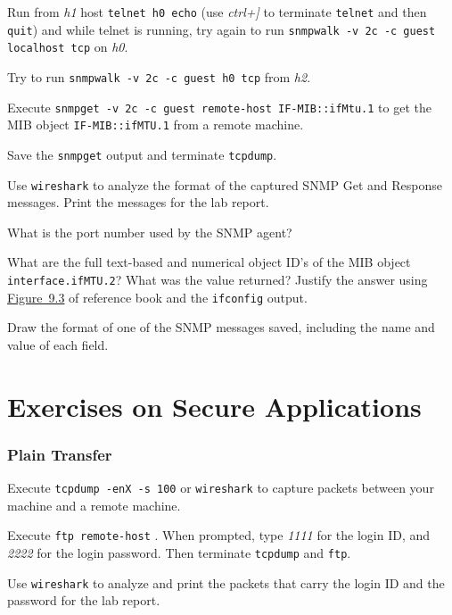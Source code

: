 \documentclass{../UTNetLab}
\begin{document}
    Run from \textit{h1} host \lstinline[emph={h0}]{telnet h0 echo} (use \textit{ctrl+]} to terminate \lstinline{telnet} and then \lstinline{quit}) and while telnet is running, try again to run \lstinline{snmpwalk -v 2c -c guest localhost tcp} on \textit{h0}.

    Try to run \lstinline[emph={h0}]{snmpwalk -v 2c -c guest h0 tcp} from \textit{h2}.

    Execute \lstinline[emph={your-host, remote-host}]{snmpget -v 2c -c guest remote-host IF-MIB::ifMtu.1} to get the MIB object \texttt{IF-MIB::ifMTU.1} from a remote machine.

    Save the \lstinline{snmpget} output and terminate \lstinline{tcpdump}.

    Use \lstinline{wireshark} to analyze the format of the captured SNMP Get and Response messages. Print the messages for the lab report.
    
    \begin{report}
    \item What is the port number used by the SNMP agent?
    
    \item What are the full text-based and numerical object ID’s of the MIB object \texttt{interface.ifMTU.2}? What was the value returned? Justify the answer using \hyperref[fig:9.3]{Figure~9.3} of reference book and the \lstinline{ifconfig} output.
    
    \item Draw the format of one of the SNMP messages saved, including the name and value of each field.
    \end{report}

\part{Exercises on Secure Applications}
    
\section{Plain Transfer}
    Execute \lstinline{tcpdump -enX -s 100} or \lstinline{wireshark} to capture packets between your machine and a remote machine.

    Execute \lstinline[emph={remote-host}]{ftp remote-host} . When prompted, type \textit{1111} for the login ID, and \textit{2222} for the login password. Then terminate \lstinline{tcpdump} and \lstinline{ftp}.

    Use \lstinline{wireshark} to analyze and print the packets that carry the login ID and the password for the lab report.
\end{document}
